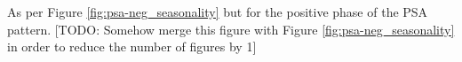 \label{fig:psa-pos_seasonality}
As per Figure \ref{fig:psa-neg_seasonality} but for the positive phase of the PSA pattern. [TODO: Somehow merge this figure with Figure \ref{fig:psa-neg_seasonality} in order to reduce the number of figures by 1] 